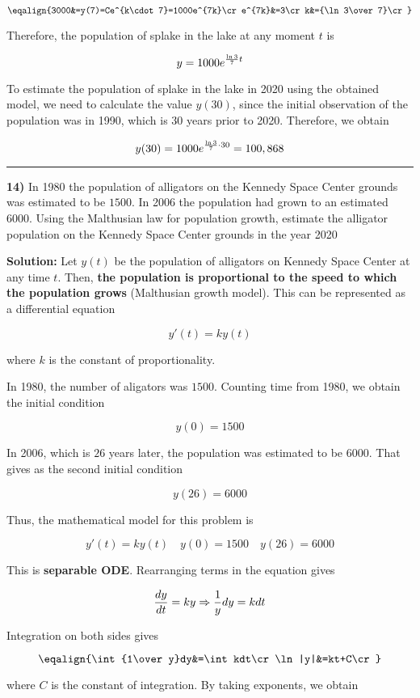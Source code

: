 $$\eqalign{3000&=y(7)=Ce^{k\cdot 7}=1000e^{7k}\cr
	e^{7k}&=3\cr
	k&={\ln 3\over 7}\cr}$$

Therefore, the population of splake in the lake at any moment $t$ is

$$y=1000e^{{\ln 3\over 7}t}$$

To estimate the population of splake in the lake in 2020 using the obtained model, we need to calculate the value $y(30)$, since the initial observation of the population was in 1990, which is $30$ years prior to 2020. Therefore, we obtain

$$y(30)=1000e^{{\ln 3\over 7}\cdot 30}=100,868$$
\vskip 1mm
\hrule

\vskip 1cm
{\bf 14)}  In 1980 the population of alligators on the Kennedy Space Center grounds was estimated to be $1500$. In 2006 the population had grown to an estimated $6000$. Using the Malthusian law for population growth, estimate the alligator population on the Kennedy Space Center grounds in the year 2020

\vskip 1cm
{\bf Solution:} Let $y(t)$ be the population of alligators on Kennedy Space Center at any time $t$. Then, {\bf the population is proportional to the speed to which the population grows} (Malthusian growth model). This can be represented as a differential equation

$$y'(t)=ky(t)$$

where $k$ is the constant of proportionality.

\vskip 1mm
In  1980, the number of aligators was $1500$. Counting time from 1980, we obtain the initial condition

$$y(0)=1500$$

In 2006, which is $26$ years later, the population was estimated to be $6000$. That gives as the second initial condition

$$y(26)=6000$$

Thus, the mathematical model for this problem is


$$y'(t)=ky(t)\quad y(0)=1500\quad y(26)=6000$$

This is {\bf separable ODE}. Rearranging terms in the equation gives

$${dy\over dt}=ky\Rightarrow {1\over y}dy=kdt$$

Integration on both sides gives

$$\eqalign{\int{1\over y}dy&=\int kdt\cr
	\ln|y|&=kt+C\cr}$$

where $C$ is the constant of integration. By taking exponents, we obtain

